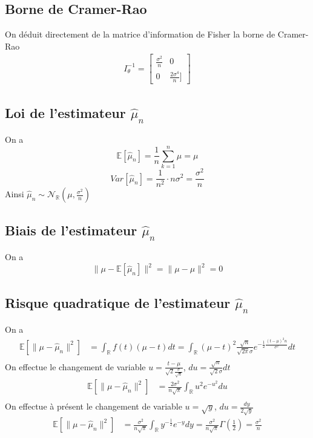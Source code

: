 \documentclass{report}
\begin{document}
		\subsection{Borne de Cramer-Rao}
			On déduit directement de la matrice d'information de Fisher la borne de Cramer-Rao
			\begin{align*}
				I_\theta^{-1}
				=
				\left[\begin{array}{cc}
					\frac{\sigma^2}{n} & 0 \\
					0 & \frac{2\sigma^4}{n}]
				\end{array}\right]
			\end{align*}
		\subsection{Loi de l'estimateur $\hat\mu_n$}
			On a
			\[ \mathbb{E}[\hat\mu_n] = \frac{1}{n}\sum\limits_{k=1}^n \mu = \mu \]
			\[ Var[\hat\mu_n] = \frac{1}{n^2} \cdot n \sigma^2 = \frac{\sigma^2}{n} \]
			Ainsi $\hat\mu_n \sim \mathcal{N}_{\mathbb{R}}(\mu, \frac{\sigma^2}{n})$
		\subsection{Biais de l'estimateur $\hat\mu_n$}
			On a
			\[ \lVert\mu - \mathbb{E}[\hat\mu_n]\rVert^2 = \lVert \mu - \mu \rVert^2 = 0 \]
		\subsection{Risque quadratique de l'estimateur $\hat\mu_n$}
			On a
			\begin{align*}
				\mathbb{E}[ \lVert \mu - \hat\mu_n \rVert^2 ] &= \int_\mathbb{R} f(t)(\mu - t)dt = \int_\mathbb{R} (\mu - t)^2 \frac{\sqrt n}{\sqrt{2\pi}\sigma}e^{-\frac{1}{2}\frac{(t-\mu)^2 n}{\sigma^2}}dt\\
			\end{align*}
			On effectue le changement de variable $u = \frac{t-\mu}{\sqrt 2 \frac{\sigma}{\sqrt n}}$, $du = \frac{\sqrt n}{\sqrt 2 \sigma}dt$
			\begin{align*}
				\mathbb{E}[ \lVert \mu - \hat\mu_n \rVert^2 ] &= \frac{2\sigma^2}{n\sqrt \pi}\int_\mathbb{R} u^2 e^{-u^2}du \\
			\end{align*}
			On effectue à présent le changement de variable $u=\sqrt y$, $du = \frac{dy}{2 \sqrt y}$
			\begin{align*}
				\mathbb{E}[ \lVert \mu - \hat\mu_n \rVert^2 ] &= \frac{\sigma^2}{n\sqrt \pi}\int_\mathbb{R} y^{-\frac{1}{2}} e^{-y}dy = \frac{\sigma^2}{n\sqrt \pi} \Gamma(\frac{1}{2}) = \frac{\sigma^2}{n} \\
			\end{align*}
\end{document}
